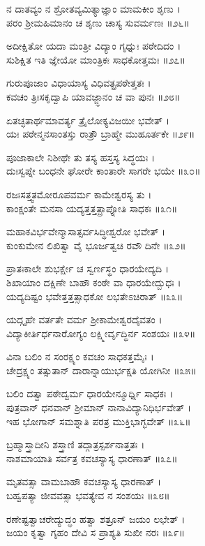 ನ ದಾತವ್ಯಂ ನ ಶ್ರೋತವ್ಯಮಿತ್ಯಾಜ್ಞಾಂ ಮಾಮಕೀಂ ಶೃಣು ।\\
ಪರಂ ಶ್ರೀಮಹಿಮಾನಂ ಚ ಶೃಣು ಚಾಸ್ಯ ಸುವರ್ಮಣಃ ॥೨೬॥

ಅದೀಕ್ಷಿತೋ ಯದಾ ಮಂತ್ರೀ ವಿದ್ಯಾಂ ಗೃಧ್ನುಃ ಪಠೇದಿದಂ ।\\
ಸುಶಿಕ್ಷಿತ ಇತಿ ಜ್ಞೇಯೋ ಮಾಂತ್ರಿಕಃ ಸಾಧಕೋತ್ತಮಃ ॥೨೭॥

ಗುರುಪೂಜಾಂ ವಿಧಾಯಾಸ್ಯ ವಿಧಿವತ್ಪ್ರಪಠೇತ್ತತಃ ।\\
ಕವಚಂ ತ್ರಿಃಸಕೃದ್ವಾಪಿ ಯಾವಜ್ಜ್ಞಾನಂ ಚ ವಾ ಪುನಃ ॥೨೮॥

ಏತಚ್ಛತಾರ್ಥಮಾವರ್ತ್ಯ ತ್ರೈಲೋಕ್ಯವಿಜಯೀ ಭವೇತ್ ।\\
ಯಃ ಪಠೇನ್ಮನಸಾಂತಸ್ತು ರಾತ್ರೌ ಬ್ರಾಹ್ಮೇ ಮುಹೂರ್ತಕೇ ॥೨೯॥

ಪೂಜಾಕಾಲೇ ನಿಶೀಥೇ ತು ತಸ್ಯ ಹಸ್ತಸ್ಯ ಸಿದ್ಧಯಃ ।\\
ದುಃಸ್ವಪ್ನೇ ಬಂಧನೇ ಘೋರೇ ಕಾಂತಾರೇ ಸಾಗರೇ ಭಯೇ ॥೩೦॥

ರಜಃಸತ್ತ್ವತಮೋರೂಪವರ್ಮ ಕಾಮೇಶ್ವರಸ್ಯ ತು ।\\
ಕಾಂಕ್ಷಂತೇ ಮನಸಾ ಯದ್ಯತ್ತತ್ತತ್ಪ್ರಾಪ್ನೋತಿ ಸಾಧಕಃ ॥೩೧॥

ಮಹಾಕವಿರ್ಭವೇನ್ಮಾಸಾತ್ಸರ್ವಸಿದ್ಧೀಶ್ವರೋ ಭವೇತ್ ।\\
ಕುಂಕುಮೇನ ಲಿಖಿತ್ವಾ ವೈ ಭೂರ್ಜತ್ವಚಿ ರವೌ ದಿನೇ ॥೩೨॥

ಪ್ರಾತಃಕಾಲೇ ಶುಭರ್ಕ್ಷೇ ಚ ಸ್ವರ್ಣಸ್ಥಂ ಧಾರಯೇದ್ಯದಿ ।\\
ಶಿಖಾಯಾಂ ದಕ್ಷಿಣೇ ಬಾಹೌ ಕಂಠೇ ವಾ ಧಾರಯೇದ್ಬುಧಃ ।\\
ಯದ್ಯದಿಷ್ಟಂ ಭವೇತ್ತತ್ತತ್ಸಾಧಕೋ ಲಭತೇಽಚಿರಾತ್ ॥೩೩॥

ಯದ್ಗೃಹೇ ವರ್ತತೇ ವರ್ಮ ಶ್ರೀಕಾಮೇಶ್ವರದೈವತಂ ।\\
ವಿದ್ಯಾಕೀರ್ತಿರ್ಧನಾರೋಗ್ಯಂ ಲಕ್ಷ್ಮೀರ್ವೃದ್ಧಿರ್ನ ಸಂಶಯಃ ॥೩೪॥

ವಿನಾ ಬಲಿಂ ನ ಸಂರಕ್ಷ್ಯಂ ಕವಚಂ ಸಾಧಕತ್ತಮೈಃ ।\\
ಚೇದ್ರಕ್ಷ್ಯಂ ತತ್ಸುತಾನ್ ದಾರಾನ್ನಾಯುರ್ಭಕ್ಷತಿ ಯೋಗಿನೀ ॥೩೫॥

ಬಲಿಂ ದತ್ವಾ ಪಠೇದ್ವರ್ಮ ಧಾರಯೇನ್ಮೂರ್ಧ್ನಿ ಸಾಧಕಃ ।\\
ಪುತ್ರವಾನ್ ಧನವಾನ್ ಶ್ರೀಮಾನ್ ನಾನಾವಿದ್ಯಾನಿಧಿರ್ಭವೇತ್ ।\\
ಇಹ ಭೋಗಾನ್ ಸಮಶ್ನಾತಿ ಪರತ್ರ ಮುಕ್ತಿಭಾಗ್ಭವೇತ್ ॥೩೬॥

ಬ್ರಹ್ಮಾಸ್ತ್ರಾದೀನಿ ಶಸ್ತ್ರಾಣಿ ತದ್ಗಾತ್ರಸ್ಪರ್ಶನಾತ್ತತಃ ।\\
ನಾಶಮಾಯಾತಿ ಸರ್ವತ್ರ ಕವಚಸ್ಯಾಸ್ಯ ಧಾರಣಾತ್ ॥೩೭॥

ಮೃತವತ್ಸಾ ವಾಮಬಾಹೌ ಕವಚಸ್ಯಾಸ್ಯ ಧಾರಣಾತ್ ।\\
ಬಹ್ವಪತ್ಯಾ ಜೀವವತ್ಸಾ ಭವತ್ಯೇವ ನ ಸಂಶಯಃ ॥೩೮॥

ರಣೇಷ್ಟತ್ವಾಚರೇದ್ಯುದ್ಧಂ ಹತ್ವಾ ಶತ್ರೂನ್ ಜಯಂ ಲಭೇತ್ ।\\
ಜಯಂ ಕೃತ್ವಾ ಗೃಹಂ ದೇವಿ ಸ ಪ್ರಾಶ್ಯತಿ ಸುಖೀ ನರಃ ॥೩೯॥

